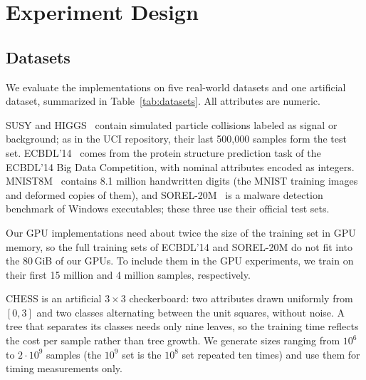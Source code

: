 \section{Experiment Design}
\label{sec:design}

\subsection{Datasets}
We evaluate the implementations on five real-world datasets and one artificial dataset, summarized in Table~\ref{tab:datasets}. All attributes are numeric.

SUSY and HIGGS~\cite{baldi2014higgs} contain simulated particle collisions labeled as signal or background; as in the UCI repository, their last 500,000 samples form the test set. ECBDL'14~\cite{triguero2015ecbdl} comes from the protein structure prediction task of the ECBDL'14 Big Data Competition, with nominal attributes encoded as integers. MNIST8M~\cite{loosli2007mnist8m} contains 8.1 million handwritten digits (the MNIST training images and deformed copies of them), and SOREL-20M~\cite{harang2020sorel} is a malware detection benchmark of Windows executables; these three use their official test sets.

Our GPU implementations need about twice the size of the training set in GPU memory, so the full training sets of ECBDL'14 and SOREL-20M do not fit into the 80\,GiB of our GPUs. To include them in the GPU experiments, we train on their first 15 million and 4 million samples, respectively.

CHESS is an artificial $3 \times 3$ checkerboard: two attributes drawn uniformly from $[0, 3]$ and two classes alternating between the unit squares, without noise. A tree that separates its classes needs only nine leaves, so the training time reflects the cost per sample rather than tree growth. We generate sizes ranging from $10^6$ to $2 \cdot 10^9$ samples (the $10^9$ set is the $10^8$ set repeated ten times) and use them for timing measurements only.

